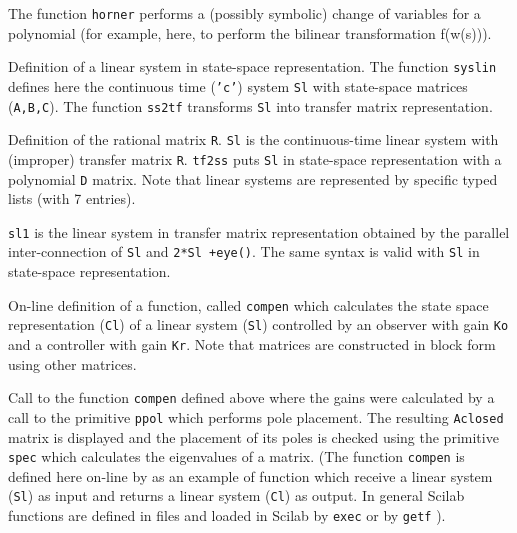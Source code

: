 \noindent\dotfill



The function {\tt horner} performs a (possibly symbolic) change of 
variables for a polynomial (for example, here, to
perform the bilinear transformation f(w(s))).

\noindent\dotfill



Definition of a linear system in state-space representation.
The function {\tt syslin} defines here the continuous time ({\tt 'c'}) system
{\tt Sl} with state-space matrices ({\tt A,B,C}). The function
{\tt ss2tf} transforms {\tt Sl} into transfer matrix representation.

\noindent\dotfill



Definition of the rational matrix {\tt R}. {\tt Sl} is the
continuous-time linear system with (improper) transfer matrix
{\tt R}. {\tt tf2ss} puts {\tt Sl} in state-space representation with a
polynomial {\tt D} matrix. Note that linear systems are represented
by specific typed lists (with 7 entries).

\noindent\dotfill



{\tt sl1} is the linear system in transfer matrix representation
obtained by the parallel inter-connection of {\tt Sl} and {\tt 2*Sl +eye()}.
The same syntax is valid with {\tt Sl} in state-space representation.

\noindent\dotfill



On-line definition of a function, called {\tt compen} which calculates the 
state space representation
({\tt Cl}) of a linear system ({\tt Sl}) controlled by an observer
with gain {\tt Ko}
and a controller with gain {\tt Kr}.  Note that matrices are constructed
in block form using other matrices.

\noindent\dotfill



Call to the function {\tt compen} defined above where the gains were
calculated by a call to the primitive {\tt ppol} which performs pole
placement.
The resulting {\tt Aclosed} matrix is displayed and the placement
of its poles is checked using the primitive {\tt spec} which calculates
the eigenvalues of a matrix. (The function {\tt compen} is defined here
on-line by  as an example of function which receive a linear system 
({\tt Sl}) as input and returns a linear system ({\tt Cl}) as output.
In general Scilab functions are defined in files and loaded in Scilab
by {\tt exec} or by {\tt getf} ).

